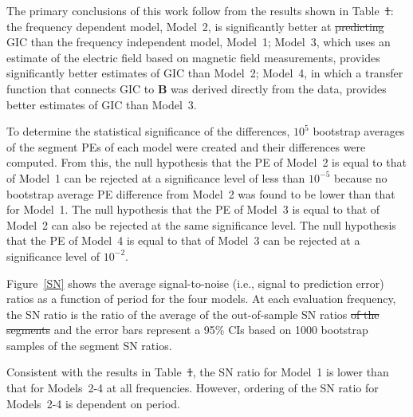 \documentclass[draft,linenumbers]{agujournal2018}
\providecommand{\DIFaddtex}[1]{{\protect\color{blue}\uwave{#1}}} %
\providecommand{\DIFdeltex}[1]{{\protect\color{red}\sout{#1}}}                      %
\providecommand{\DIFaddbegin}{} %
\providecommand{\DIFaddend}{} %
\providecommand{\DIFdelbegin}{} %
\providecommand{\DIFdelend}{} %
\providecommand{\DIFadd}[1]{\texorpdfstring{\DIFaddtex{#1}}{#1}} %
\providecommand{\DIFdel}[1]{\texorpdfstring{\DIFdeltex{#1}}{}} %
\begin{document}
\DIFdelend The primary conclusions of this work follow from the results shown in Table~\DIFdelbegin \DIFdel{1}\DIFdelend \DIFaddbegin \DIFadd{\ref{results}}\DIFaddend : the frequency dependent model, Model~2, is significantly better at \DIFdelbegin \DIFdel{predicting }\DIFdelend \DIFaddbegin \DIFadd{estimating }\DIFaddend GIC than the frequency independent model, Model~1; Model~3, which uses an estimate of the electric field based on magnetic field measurements, provides significantly better estimates of GIC than Model~2; Model~4, in which a transfer function that connects GIC to $\mathbf{B}$ was derived directly from the data, provides better estimates of GIC than Model~3.

To determine the statistical significance of the \DIFaddbegin \DIFadd{PE }\DIFaddend differences, $10^5$ bootstrap averages of the segment PEs of each model were created and their differences were computed. From this, the null hypothesis that the PE of Model~2 is equal to that of Model~1 can be rejected at a significance level of less than $10^{-5}$ because no bootstrap average PE difference from Model~2 was found to be lower than that for Model~1. The null hypothesis that the PE of Model~3 is equal to that of Model~2 can also be rejected at the same significance level. The null hypothesis that the PE of Model~4 is equal to that of Model~3 can be rejected at a significance level of $10^{-2}$.

\DIFdelbegin %

\DIFdelend Figure~\ref{SN} shows the average signal-to-noise (i.e., signal to prediction error) ratios as a function of period for the four models. At each evaluation frequency, the SN ratio is the ratio of the average of the out-of-sample SN ratios \DIFdelbegin \DIFdel{of the segments }\DIFdelend and the error bars represent a 95\% CIs based on 1000 bootstrap samples of the segment SN ratios. \DIFdelbegin %

\DIFdelend Consistent with the results in Table~\DIFdelbegin \DIFdel{1}\DIFdelend \DIFaddbegin \DIFadd{\ref{results}}\DIFaddend , the SN ratio for Model~1 is lower than that for Models~2-4 at all frequencies. However, ordering of the SN ratio for Models~2-4 is dependent on period. 
\end{document}
